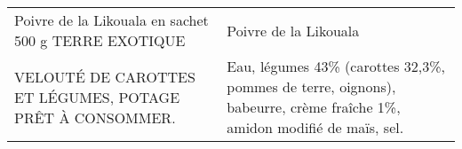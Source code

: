 \begin{longtable}{p{5cm}p{10cm}}
                                                     Poivre de la Likouala en sachet 500 g TERRE EXOTIQUE &                                                                                                                                                                                                                                                                                                                                                                                                                                                                                                                                                                                                                                                                                                                                                                                                                                                                                                                                                                                                                    Poivre de la Likouala \\
                                                 VELOUTÉ DE CAROTTES ET LÉGUMES, POTAGE PRÊT À CONSOMMER. &                                                                                                                                                                                                                                                                                                                                                                                                                                                                                                                                                                                                                                                                                                                                                                                                                                                                                                                    Eau, légumes 43\% (carottes 32,3\%, pommes de terre, oignons), babeurre, crème fraîche 1\%, amidon modifié de maïs, sel. \\

\end{longtable}
